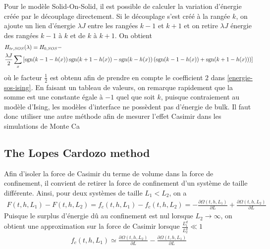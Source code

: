 Pour le modèle Solid-On-Solid, il est possible de calculer la variation d'énergie créée par le découplage directement. Si le découplage s'est créé à la rangée $k$, on ajoute un lien d'énergie $\lambda J$ entre les rangées $k-1$ et $k+1$ et on retire $\lambda J$ énergie des rangées $k-1$ à $k$  et de $k$ à $k+1$. On obtient
\begin{align}
    &H_{tr,SOS}(\lambda) = H_{0,SOS} - \nonumber \\
     &\frac{\lambda J}{2} \sum_x \left[ \operatorname{sgn}(k-1-h(x)) \operatorname{sgn}(k+1-h(x)) - \operatorname{sgn}(k-h(x)) \left( \operatorname{sgn}(k-1-h(x))+\operatorname{sgn}(k+1-h(x)) \right) \right]
\end{align}
où le facteur $\frac{1}{2}$ est obtenu afin de prendre en compte le coefficient $2$ dans \ref{energie-sos-ising}. En faisant un tableau de valeurs, on remarque rapidement que la somme est une constante égale à $-1$ quel que soit $k$, puisque contraiement au modèle d'Ising, les modèles d'interface ne possèdent pas d'énergie de bulk. Il faut donc utiliser une autre méthode afin de mesurer l'effet Casimir dans les simulations de Monte Ca    

    \subsection{The Lopes Cardozo method}

Afin d'isoler la force de Casimir du terme de volume dans la force de confinement, il convient de retirer la force de confinement d'un système de taille différente. Ainsi, pour deux systèmes de taille $L_1 \less L_2$, on a 
\begin{align}
    F(t,h,L_1) - F(t,h,L_2) = f_c(t,h,L_1) - f_c(t,h,L_2) =  - \frac{\partial \Omega(t,h,L_1)}{\partial L}  + \frac{\partial \Omega(t,h,L_2)}{\partial L} 
\end{align}
Puisque le surplus d'énergie dû au confinement est nul lorsque $L_2\to \infty$, on obtient une approximation sur la force de Casimir lorsque $\frac{L_1^d}{L_2^d} \ll 1$ 
\begin{align}
    f_c(t,h,L_1) \simeq  \frac{\partial \Omega(t,h,L_2)}{\partial L}  - \frac{\partial \Omega(t,h,L_1)}{\partial L} 
    \label{casimir-diff-omega}   
\end{align}

